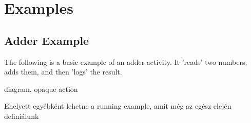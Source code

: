 \clearpage\section{Examples}

\subsection{Adder Example}

The following is a basic example of an adder activity.
It 'reads' two numbers, adds them, and then 'logs' the result.

diagram, opaque action

Ehelyett egyébként lehetne a running example, amit még az egész elején definiálunk


